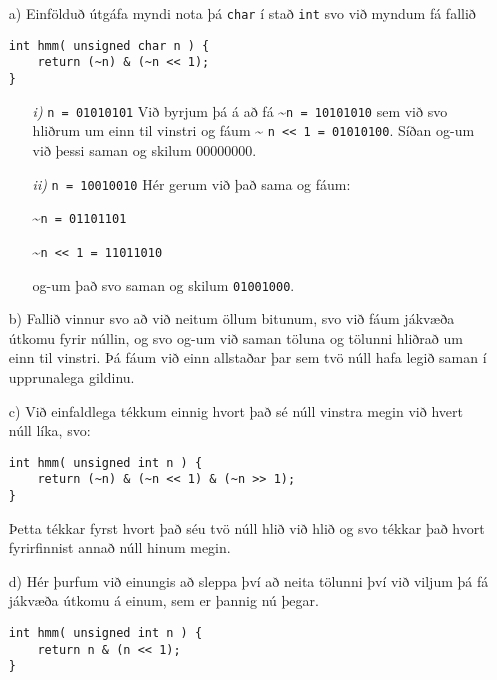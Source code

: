 \documentclass{article}
\begin{document}
	\begin{itemize}
		\item[a)] Einfölduð útgáfa myndi nota þá \texttt{char} í stað 
			\texttt{int} svo við myndum fá fallið

			\begin{Verbatim}[fontfamily=courier]
int hmm( unsigned char n ) {
	return (~n) & (~n << 1);
}
			\end{Verbatim}
			\begin{itemize}
				\item[\textit{i)}] \texttt{n = 01010101}
					Við byrjum þá á að fá \textasciitilde\texttt{n = 10101010} sem við 
					svo hliðrum um einn til vinstri og fáum \textasciitilde
					\texttt{n <{}< 1 = 01010100}. Síðan og-um við þessi 
					saman og skilum 00000000.
				\item[\textit{ii)}] \texttt{n = 10010010}
					Hér gerum við það sama og fáum:

					\textasciitilde\texttt{n = 01101101}

					\textasciitilde\texttt{n <{}< 1 = 11011010}

					og-um það svo saman og skilum \texttt{01001000}.
			\end{itemize}

		\item[b)] 
			Fallið vinnur svo að við neitum öllum bitunum, svo við fáum jákvæða 
			útkomu fyrir núllin, og svo og-um við saman töluna og 
			tölunni hliðrað um einn til vinstri. Þá fáum við einn allstaðar 
			þar sem tvö núll hafa legið saman í upprunalega gildinu.
		\item[c)] Við einfaldlega tékkum einnig hvort það sé núll vinstra 
			megin við hvert núll líka, svo:

			\begin{Verbatim}[fontfamily=courier]
int hmm( unsigned int n ) {
	return (~n) & (~n << 1) & (~n >> 1);
}
			\end{Verbatim}

			Þetta tékkar fyrst hvort það séu tvö núll hlið 
			við hlið og svo tékkar það hvort fyrirfinnist annað núll hinum 
			megin.
		\item[d)] Hér þurfum við einungis að sleppa því að neita tölunni 
			því við viljum þá fá jákvæða útkomu á einum, sem er þannig nú 
			þegar.

			\begin{Verbatim}[fontfamily=courier]
int hmm( unsigned int n ) {
	return n & (n << 1);
}
			\end{Verbatim}
	\end{itemize}
\end{document}
